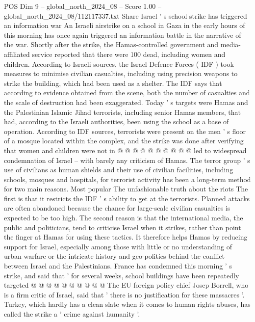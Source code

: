 \begin{textsample}{POS Dim 9 – global\_north\_2024\_08 – Score 1.00 – global\_north\_2024\_08/112117337.txt}  \label{ex:f9_pos_358}
Share Israel ' s school strike has triggered an information war An Israeli airstrike on a school in Gaza in the early hours of this morning has once again triggered an information battle in the narrative of the war.
Shortly after the strike, the Hamas-controlled government and media-affiliated service reported that there were 100 dead, including women and children.
According to Israeli sources, the Israel Defence Forces ( IDF ) took measures to minimise civilian casualties, including using precision weapons to strike the building, which had been used as a shelter.
The IDF says that according to evidence obtained from the scene, both the number of casualties and the scale of destruction had been exaggerated.
Today ' s targets were Hamas and the Palestinian Islamic Jihad terrorists, including senior Hamas members, that had, according to the Israeli authorities, been using the school as a base of operation.
According to IDF sources, terrorists were present on the men ' s floor of a mosque located within the complex, and the strike was done after verifying that women and children were not in @ @ @ @ @ @ @ @ @ @ led to widespread condemnation of Israel -- with barely any criticism of Hamas.
The terror group ' s use of civilians as human shields and their use of civilian facilities, including schools, mosques and hospitals, for terrorist activity has been a long-term method for two main reasons.
Most popular The unfashionable truth about the riots The first is that it restricts the IDF ' s ability to get at the terrorists.
Planned attacks are often abandoned because the chance for large-scale civilian casualties is expected to be too high.
The second reason is that the international media, the public and politicians, tend to criticise Israel when it strikes, rather than point the finger at Hamas for using these tactics.
It therefore helps Hamas by reducing support for Israel, especially among those with little or no understanding of urban warfare or the intricate history and geo-politics behind the conflict between Israel and the Palestinians.
France has condemned this morning ' s strike, and said that ' for several weeks, school buildings have been repeatedly targeted @ @ @ @ @ @ @ @ @ @ The EU foreign policy chief Josep Borrell, who is a firm critic of Israel, said that ' there is no justification for these massacres '.
Turkey, which hardly has a clean slate when it comes to human rights abuses, has called the strike a ' crime against humanity '.

\end{textsample}
